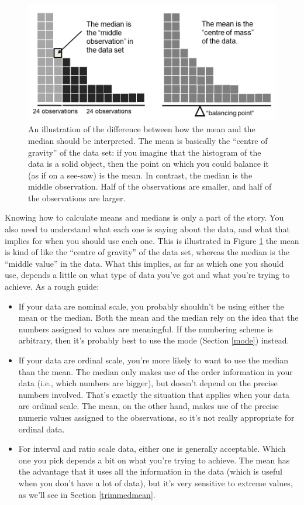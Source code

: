 \documentclass[
]{book}
\providecommand{\tightlist}{%
  \setlength{\itemsep}{0pt}\setlength{\parskip}{0pt}}
\begin{document}
\begin{figure}
\centering
\includegraphics{./img/descriptives2/meanmedian.png}
\caption{\label{fig:meanmedian}An illustration of the difference between how the mean and the median should be interpreted. The mean is basically the ``centre of gravity'' of the data set: if you imagine that the histogram of the data is a solid object, then the point on which you could balance it (as if on a see-saw) is the mean. In contrast, the median is the middle observation. Half of the observations are smaller, and half of the observations are larger.}
\end{figure}

Knowing how to calculate means and medians is only a part of the story. You also need to understand what each one is saying about the data, and what that implies for when you should use each one. This is illustrated in Figure \ref{fig:meanmedian} the mean is kind of like the ``centre of gravity'' of the data set, whereas the median is the ``middle value'' in the data. What this implies, as far as which one you should use, depends a little on what type of data you've got and what you're trying to achieve. As a rough guide:

\begin{itemize}
\tightlist
\item
  If your data are nominal scale, you probably shouldn't be using either the mean or the median. Both the mean and the median rely on the idea that the numbers assigned to values are meaningful. If the numbering scheme is arbitrary, then it's probably best to use the mode (Section \ref{mode}) instead.
\item
  If your data are ordinal scale, you're more likely to want to use the median than the mean. The median only makes use of the order information in your data (i.e., which numbers are bigger), but doesn't depend on the precise numbers involved. That's exactly the situation that applies when your data are ordinal scale. The mean, on the other hand, makes use of the precise numeric values assigned to the observations, so it's not really appropriate for ordinal data.
\item
  For interval and ratio scale data, either one is generally acceptable. Which one you pick depends a bit on what you're trying to achieve. The mean has the advantage that it uses all the information in the data (which is useful when you don't have a lot of data), but it's very sensitive to extreme values, as we'll see in Section \ref{trimmedmean}.
\end{itemize}
\end{document}
